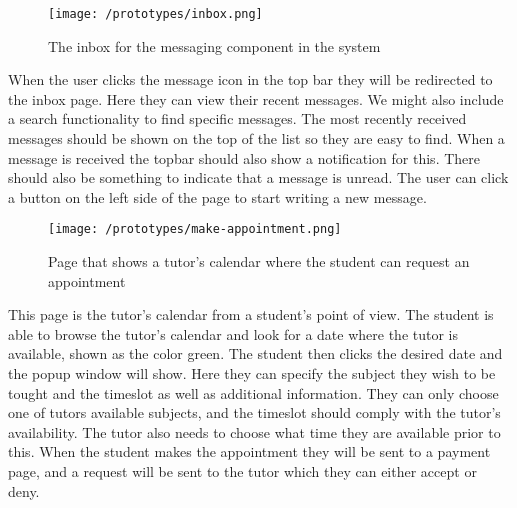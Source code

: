  \begin{figure}[H]
    \texttt{[image: /prototypes/inbox.png]}
     \caption{The inbox for the messaging component in the system}
     \label{fig:inbox}
 \end{figure}
When the user clicks the message icon in the top bar they will be redirected to the inbox page. Here they can view their recent messages. 
We might also include a search functionality to find specific messages. 
The most recently received messages should be shown on the top of the list so they are easy to find. 
When a message is received the topbar should also show a notification for this. 
There should also be something to indicate that a message is unread. 
The user can click a button on the left side of the page to start writing a new message. 


 \begin{figure}[H]
    \texttt{[image: /prototypes/make-appointment.png]}
     \caption{Page that shows a tutor's calendar where the student can request an appointment}
     \label{fig:make-appointment}
 \end{figure}
 This page is the tutor's calendar from a student's point of view. 
 The student is able to browse the tutor's calendar and look for a date where the tutor is available, shown as the color green. 
 The student then clicks the desired date and the popup window will show. 
 Here they can specify the subject they wish to be tought and the timeslot as well as additional information. 
 They can only choose one of tutors available subjects, and the timeslot should comply with the tutor's availability. 
 The tutor also needs to choose what time they are available prior to this.
 When the student makes the appointment they will be sent to a payment page, and a request will be sent to the tutor which they can either accept or deny. 

